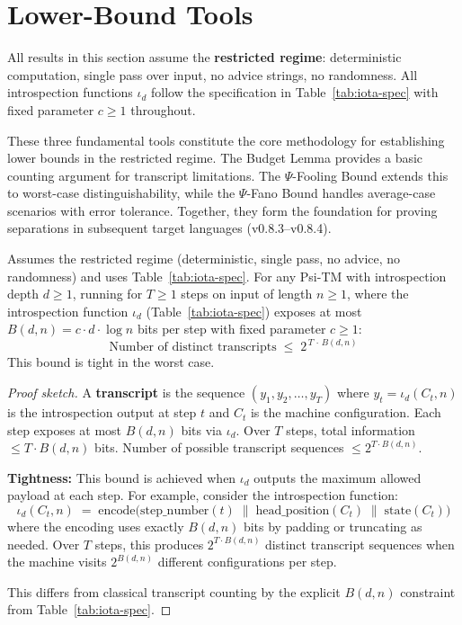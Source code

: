 
\section{Lower-Bound Tools}
\label{sec:lower-bound-tools}

\begin{remark}
All results in this section assume the \textbf{restricted regime}: deterministic computation, single pass over input, no advice strings, no randomness. All introspection functions $\iota_d$ follow the specification in Table~\ref{tab:iota-spec} with fixed parameter $c \geq 1$ throughout.
\end{remark}

These three fundamental tools constitute the core methodology for establishing lower bounds in the restricted regime. The Budget Lemma provides a basic counting argument for transcript limitations. The $\Psi$-Fooling Bound extends this to worst-case distinguishability, while the $\Psi$-Fano Bound handles average-case scenarios with error tolerance. Together, they form the foundation for proving separations in subsequent target languages (v0.8.3--v0.8.4).

\begin{lemma}
\label{lem:budget}
Assumes the restricted regime (deterministic, single pass, no advice, no randomness) and uses Table~\ref{tab:iota-spec}.
For any Psi-TM with introspection depth $d \geq 1$, running for $T \geq 1$ steps on input of length $n \geq 1$, where the introspection function $\iota_d$ (Table~\ref{tab:iota-spec}) exposes at most $B(d,n) = c \cdot d \cdot \log n$ bits per step with fixed parameter $c \geq 1$:
\begin{equation}
\label{eq:budget-bound}
\text{Number of distinct transcripts} \;\leq\; 2^{\,T\,\cdot\, B(d,n)}
\end{equation}
This bound is tight in the worst case.
\end{lemma}

\begin{proof}[Proof sketch]
A \textbf{transcript} is the sequence $(y_1, y_2, \ldots, y_T)$ where $y_t = \iota_d(C_t, n)$ is the introspection output at step $t$ and $C_t$ is the machine configuration. Each step exposes at most $B(d,n)$ bits via $\iota_d$. Over $T$ steps, total information $\leq T \cdot B(d,n)$ bits. Number of possible transcript sequences $\leq 2^{T \cdot B(d,n)}$.

\textbf{Tightness:} This bound is achieved when $\iota_d$ outputs the maximum allowed payload at each step. For example, consider the introspection function:
\[
\iota_d(C_t, n) \;=\; \text{encode}\big(\text{step\_number}(t) \;\|\; \text{head\_position}(C_t) \;\|\; \text{state}(C_t)\big)
\]
where the encoding uses exactly $B(d,n)$ bits by padding or truncating as needed. Over $T$ steps, this produces $2^{T \cdot B(d,n)}$ distinct transcript sequences when the machine visits $2^{B(d,n)}$ different configurations per step.

This differs from classical transcript counting by the explicit $B(d,n)$ constraint from Table~\ref{tab:iota-spec}.
\end{proof}

